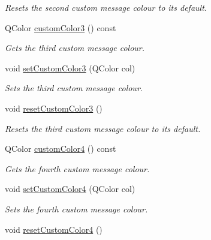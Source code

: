 \begin{DoxyCompactItemize}
\begin{DoxyCompactList}\small\item\em Resets the second custom message colour to its default. \end{DoxyCompactList}\item 
Q\-Color \hyperlink{class_console_widget_a50faf85bc735a6ce59222eb2f229c7c5}{custom\-Color3} () const 
\begin{DoxyCompactList}\small\item\em Gets the third custom message colour. \end{DoxyCompactList}\item 
void \hyperlink{class_console_widget_aed0c8abe6d9b92aef97266e2b93b347f}{set\-Custom\-Color3} (Q\-Color col)
\begin{DoxyCompactList}\small\item\em Sets the third custom message colour. \end{DoxyCompactList}\item 
\hypertarget{class_console_widget_acdb81d6a8a21fcb15ebbf3c0cefcd434}{void \hyperlink{class_console_widget_acdb81d6a8a21fcb15ebbf3c0cefcd434}{reset\-Custom\-Color3} ()}\label{class_console_widget_acdb81d6a8a21fcb15ebbf3c0cefcd434}

\begin{DoxyCompactList}\small\item\em Resets the third custom message colour to its default. \end{DoxyCompactList}\item 
Q\-Color \hyperlink{class_console_widget_a7acd9d9d522e5add2107befebf86a839}{custom\-Color4} () const 
\begin{DoxyCompactList}\small\item\em Gets the fourth custom message colour. \end{DoxyCompactList}\item 
void \hyperlink{class_console_widget_ae10358d0184634959dd97e65e19bd9ef}{set\-Custom\-Color4} (Q\-Color col)
\begin{DoxyCompactList}\small\item\em Sets the fourth custom message colour. \end{DoxyCompactList}\item 
\hypertarget{class_console_widget_ac955271b9857a7f7e1a23d25a6c9082d}{void \hyperlink{class_console_widget_ac955271b9857a7f7e1a23d25a6c9082d}{reset\-Custom\-Color4} ()}\label{class_console_widget_ac955271b9857a7f7e1a23d25a6c9082d}


\end{DoxyCompactItemize}
